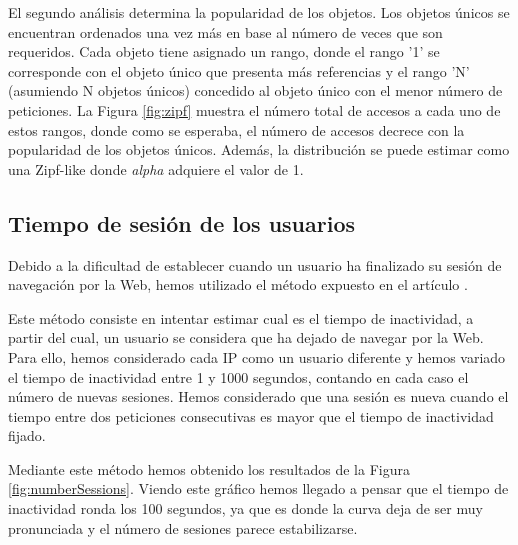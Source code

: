 \documentclass[twocolumn]{Jornadas}
\begin{document}
El segundo análisis determina la popularidad de los objetos. Los objetos únicos se encuentran ordenados una vez más en base al número de veces que son requeridos. Cada objeto tiene asignado un rango, donde el rango '1' se corresponde con el objeto único que presenta más referencias y el rango 'N' (asumiendo N objetos únicos) concedido al objeto único con el menor número de peticiones. La Figura \ref{fig:zipf} muestra el número total de accesos a cada uno de estos rangos, donde como se esperaba, el número de accesos decrece con la popularidad de los objetos únicos. Además, la distribución se puede estimar como una Zipf-like donde \emph{alpha} adquiere el valor de 1.

\subsection{Tiempo de sesión de los usuarios}
Debido a la dificultad de establecer cuando un usuario ha finalizado su sesión de navegación por la Web, hemos utilizado el método expuesto en el artículo \cite{adya2001analyzing}.

Este método consiste en intentar estimar cual es el tiempo de inactividad, a partir del cual, un usuario se considera que ha dejado de navegar por la Web. Para ello, hemos considerado cada IP como un usuario diferente y hemos variado el tiempo de inactividad entre 1 y 1000 segundos, contando en cada caso el número de nuevas sesiones. Hemos considerado que una sesión es nueva cuando el tiempo entre dos peticiones consecutivas es mayor que el tiempo de inactividad fijado.

Mediante este método hemos obtenido los resultados de la Figura \ref{fig:numberSessions}. Viendo este gráfico hemos llegado a pensar que el tiempo de inactividad ronda los 100 segundos, ya que es donde la curva deja de ser muy pronunciada y el número de sesiones parece estabilizarse.
\end{document}
